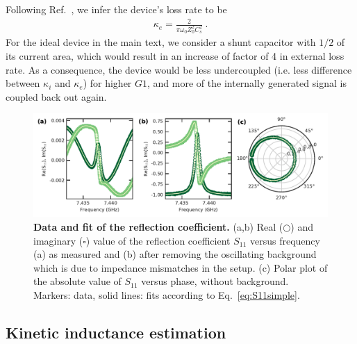 Following Ref.~\cite{bosmanBroadbandArchitectureGalvanically2015c}, we infer the device's loss rate to be
%
\begin{align}
\kappa_e = \frac{2}{\pi\omega_0 Z_0^2 C_s^2} \ .
\label{eq:kappae_analytical}
\end{align}
%
For the ideal device in the main text, we consider a shunt capacitor with $1/2$ of its current area, which would result in an increase of factor of 4 in external loss rate.
%
As a consequence, the device would be less undercoupled (i.e. less difference between $\kappa_i$ and $\kappa_e$) for higher $G1$, and more of the internally generated signal is coupled back out again.

\begin{figure}
	\centering
	\includegraphics[width=\linewidth]{chapter-currentdetection/figures/SM_reflection_coefficient}
	\caption{
		\textbf{Data and fit of the reflection coefficient.}
		(a,b) Real ($\bigcirc$) and imaginary ($\square$) value of the reflection coefficient $S_{11}$ versus frequency (a) as measured and (b) after removing the oscillating background which is due to impedance mismatches in the setup.
		(c) Polar plot of the absolute value of $S_{11}$ versus phase, without background.
		Markers: data, solid lines: fits according to Eq.~\eqref{eq:S11simple}.
		\label{fig:s11fitabs}
	}
\end{figure}


\subsection{Kinetic inductance estimation}\label{sec:Lk}

